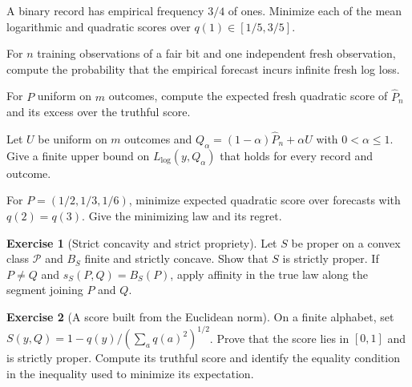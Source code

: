 \documentclass[11pt,oneside]{book}
\theoremstyle{definition}
\newtheorem{exercise}{Exercise}[section]
\theoremstyle{remark}
\begin{document}
\begin{practiceexercise}
\label{pex:proper-score-clipped-binary-fit}
A binary record has empirical frequency $3/4$ of ones.
Minimize each of the mean logarithmic and quadratic scores
over $q(1)\in[1/5,3/5]$.
\end{practiceexercise}

\begin{practiceexercise}
\label{pex:proper-score-unseen-fair-bit}
For $n$ training observations of a fair bit and one independent
fresh observation, compute the probability that the empirical
forecast incurs infinite fresh log loss.
\end{practiceexercise}

\begin{practiceexercise}
\label{pex:quadratic-score-fresh-uniform}
For $P$ uniform on $m$ outcomes, compute the expected fresh
quadratic score of $\widehat P_n$ and its excess over the
truthful score.
\end{practiceexercise}

\begin{practiceexercise}
\label{pex:proper-score-smoothed-log-bound}
Let $U$ be uniform on $m$ outcomes and
$Q_\alpha=(1-\alpha)\widehat P_n+\alpha U$ with $0<\alpha\leq1$.
Give a finite upper bound on $L_{\log}(y,Q_\alpha)$ that holds
for every record and outcome.
\end{practiceexercise}

\begin{practiceexercise}
\label{pex:proper-score-pool-two-categories}
For $P=(1/2,1/3,1/6)$, minimize expected quadratic score
over forecasts with $q(2)=q(3)$. Give the minimizing law
and its regret.
\end{practiceexercise}

\begin{exercise}[Strict concavity and strict propriety]
\label{exer:proper-score-strict-concavity-converse}
Let $S$ be proper on a convex class $\mathcal P$ and $B_S$
finite and strictly concave. Show that $S$ is strictly proper.
If $P\ne Q$ and $s_S(P,Q)=B_S(P)$, apply affinity in the true
law along the segment joining $P$ and $Q$.
\end{exercise}

\begin{exercise}[A score built from the Euclidean norm]
\label{exer:spherical-score-propriety}
On a finite alphabet, set
$S(y,Q)=1-q(y)/(\sum_a q(a)^2)^{1/2}$.
Prove that the score lies in $[0,1]$ and is strictly proper.
Compute its truthful score and identify the equality condition
in the inequality used to minimize its expectation.
\end{exercise}
\end{document}
